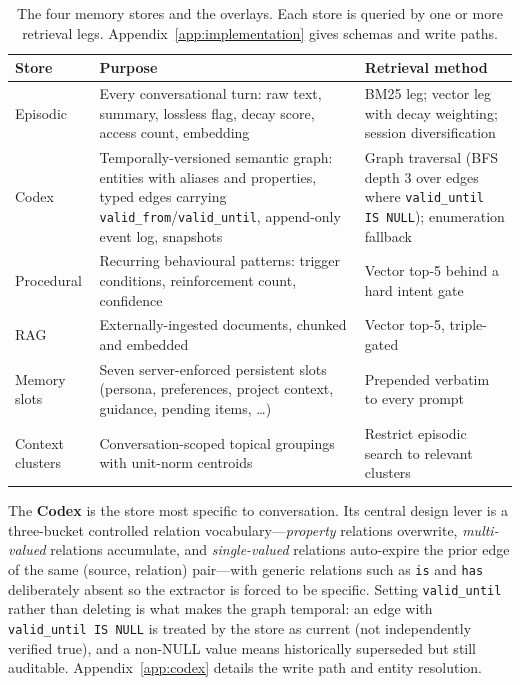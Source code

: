 \documentclass[11pt,a4paper]{article}
\begin{document}
\begin{table}[htbp]
\centering
\small
\caption{The four memory stores and the overlays. Each store is queried by one or more retrieval legs. Appendix~\ref{app:implementation} gives schemas and write paths.}
\label{tab:stores}
\begin{tabular}{@{}L{2.2cm}L{6.0cm}L{4.4cm}@{}}
\toprule
\textbf{Store} & \textbf{Purpose} & \textbf{Retrieval method} \\
\midrule
Episodic & Every conversational turn: raw text, summary, lossless flag, decay score, access count, embedding & BM25 leg; vector leg with decay weighting; session diversification \\
Codex & Temporally-versioned semantic graph: entities with aliases and properties, typed edges carrying \texttt{valid\_from}/\texttt{valid\_until}, append-only event log, snapshots & Graph traversal (BFS depth 3 over edges where \texttt{valid\_until IS NULL}); enumeration fallback \\
Procedural & Recurring behavioural patterns: trigger conditions, reinforcement count, confidence & Vector top-5 behind a hard intent gate \\
RAG & Externally-ingested documents, chunked and embedded & Vector top-5, triple-gated \\
\midrule
Memory slots & Seven server-enforced persistent slots (persona, preferences, project context, guidance, pending items, \ldots) & Prepended verbatim to every prompt \\
Context clusters & Conversation-scoped topical groupings with unit-norm centroids & Restrict episodic search to relevant clusters \\
\bottomrule
\end{tabular}
\end{table}

The \textbf{Codex} is the store most specific to conversation. Its central design lever is a three-bucket controlled relation vocabulary---\emph{property} relations overwrite, \emph{multi-valued} relations accumulate, and \emph{single-valued} relations auto-expire the prior edge of the same (source, relation) pair---with generic relations such as \texttt{is} and \texttt{has} deliberately absent so the extractor is forced to be specific. Setting \texttt{valid\_until} rather than deleting is what makes the graph temporal: an edge with \texttt{valid\_until IS NULL} is treated by the store as current (not independently verified true), and a non-NULL value means historically superseded but still auditable. Appendix~\ref{app:codex} details the write path and entity resolution.
\end{document}
